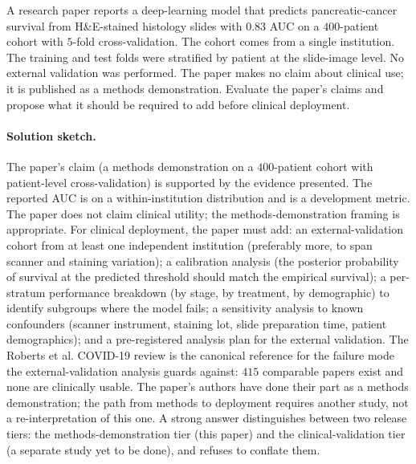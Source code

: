 \begin{exercise}
A research paper reports a deep-learning model that predicts
pancreatic-cancer survival from H\&E-stained histology slides with
$0.83$ AUC on a $400$-patient cohort with $5$-fold cross-validation.
The cohort comes from a single institution. The training and test
folds were stratified by patient at the slide-image level. No
external validation was performed. The paper makes no claim about
clinical use; it is published as a methods demonstration. Evaluate
the paper's claims and propose what it should be required to add
before clinical deployment.

\paragraph{Solution sketch.}
The paper's claim (a methods demonstration on a $400$-patient cohort
with patient-level cross-validation) is supported by the evidence
presented. The reported AUC is on a within-institution distribution
and is a development metric. The paper does not claim clinical
utility; the methods-demonstration framing is appropriate. For
clinical deployment, the paper must add: an external-validation
cohort from at least one independent institution (preferably more,
to span scanner and staining variation); a calibration analysis (the
posterior probability of survival at the predicted threshold should
match the empirical survival); a per-stratum performance breakdown
(by stage, by treatment, by demographic) to identify subgroups where
the model fails; a sensitivity analysis to known confounders
(scanner instrument, staining lot, slide preparation time, patient
demographics); and a pre-registered analysis plan for the external
validation. The Roberts et al. COVID-19 review is the canonical
reference for the failure mode the external-validation analysis
guards against: $415$ comparable papers exist and none are clinically
usable. The paper's authors have done their part as a methods
demonstration; the path from methods to deployment requires another
study, not a re-interpretation of this one. A strong answer
distinguishes between two release tiers: the methods-demonstration
tier (this paper) and the clinical-validation tier (a separate study
yet to be done), and refuses to conflate them.
\end{exercise}

